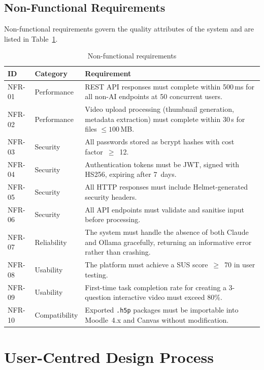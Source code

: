 \subsection{Non-Functional Requirements}

Non-functional requirements govern the quality attributes of the system
and are listed in Table~\ref{tab:nonfunc_reqs}.

\begin{table}[H]
  \centering
  \caption{Non-functional requirements}
  \label{tab:nonfunc_reqs}
  \begin{tabularx}{\linewidth}{llX}
    \toprule
    \textbf{ID} & \textbf{Category} & \textbf{Requirement} \\
    \midrule
    NFR-01 & Performance  & REST API responses must complete within 500\,ms for all non-AI endpoints at 50 concurrent users. \\
    NFR-02 & Performance  & Video upload processing (thumbnail generation, metadata extraction) must complete within 30\,s for files $\leq 100$\,MB. \\
    NFR-03 & Security     & All passwords stored as bcrypt hashes with cost factor~$\geq$~12. \\
    NFR-04 & Security     & Authentication tokens must be JWT, signed with HS256, expiring after 7~days. \\
    NFR-05 & Security     & All HTTP responses must include Helmet-generated security headers. \\
    NFR-06 & Security     & All API endpoints must validate and sanitise input before processing. \\
    NFR-07 & Reliability  & The system must handle the absence of both Claude and Ollama gracefully, returning an informative error rather than crashing. \\
    NFR-08 & Usability    & The platform must achieve a SUS score~$\geq$~70 in user testing. \\
    NFR-09 & Usability    & First-time task completion rate for creating a 3-question interactive video must exceed 80\%. \\
    NFR-10 & Compatibility & Exported \texttt{.h5p} packages must be importable into Moodle~4.x and Canvas without modification. \\
    \bottomrule
  \end{tabularx}
\end{table}

\section{User-Centred Design Process}


